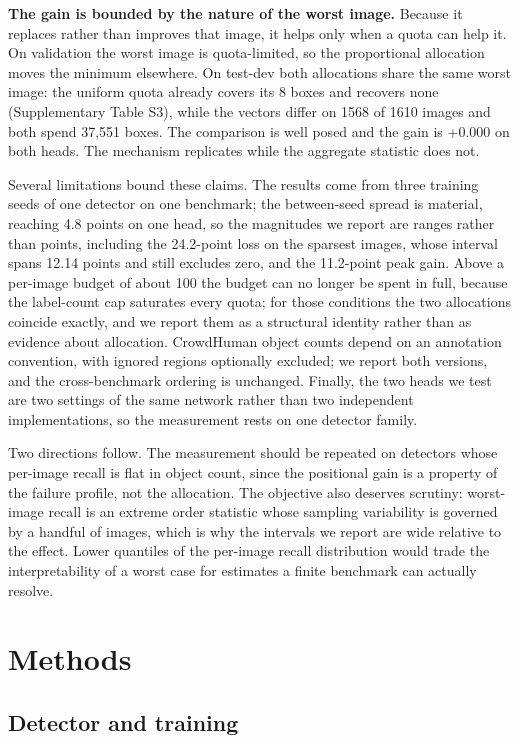 \documentclass[sn-mathphys,Numbered]{sn-jnl}
\begin{document}
\textbf{The gain is bounded by the nature of the worst image.} Because it replaces rather than improves that image, it helps only when a quota can help it. On validation the worst image is quota-limited, so the proportional allocation moves the minimum elsewhere. On test-dev both allocations share the same worst image: the uniform quota already covers its 8 boxes and recovers none (Supplementary Table S3), while the vectors differ on 1568 of 1610 images and both spend 37,551 boxes. The comparison is well posed and the gain is +0.000 on both heads. The mechanism replicates while the aggregate statistic does not.

Several limitations bound these claims. The results come from three training seeds of one detector on one benchmark; the between-seed spread is material, reaching 4.8 points on one head, so the magnitudes we report are ranges rather than points, including the 24.2-point loss on the sparsest images, whose interval spans 12.14 points and still excludes zero, and the 11.2-point peak gain. Above a per-image budget of about 100 the budget can no longer be spent in full, because the label-count cap saturates every quota; for those conditions the two allocations coincide exactly, and we report them as a structural identity rather than as evidence about allocation. CrowdHuman \cite{shao2019crowdhuman} object counts depend on an annotation convention, with ignored regions optionally excluded; we report both versions, and the cross-benchmark ordering is unchanged. Finally, the two heads we test are two settings of the same network rather than two independent implementations, so the measurement rests on one detector family.

Two directions follow. The measurement should be repeated on detectors whose per-image recall is flat in object count, since the positional gain is a property of the failure profile, not the allocation. The objective also deserves scrutiny: worst-image recall is an extreme order statistic whose sampling variability is governed by a handful of images, which is why the intervals we report are wide relative to the effect. Lower quantiles of the per-image recall distribution would trade the interpretability of a worst case for estimates a finite benchmark can actually resolve.

\section{Methods}
\subsection{Detector and training}
\end{document}
